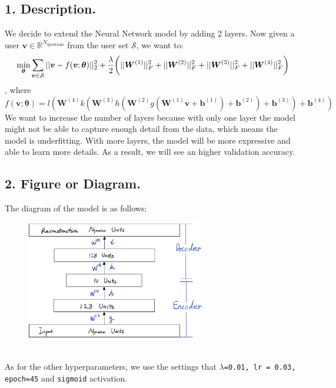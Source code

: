 \documentclass{article}
\newcommand{\coding}[1]{\colorbox{light-gray}{\texttt{#1}}}
\newcommand{\bb}[3]{\bigg{#1} #3 \bigg{#2}}
\begin{document}
\begin{spacing}{1.5}
\subsection*{1. Description.}
We decide to extend the Neural Network model by adding 2 layers. Now given a user $\bm{v}\in \mathbb{R}^{N_{\text{questions}}}$ from the user set $\mathcal{S}$, we want to: 
\[\min_{\bm{\theta}} \sum_{\bm{v} \in \mathcal{S}}||\bm{v} - f(\bm{v}; \bm{\theta})||_2^2 + \frac{\lambda}{2}\bb{(}{)}{||\bm{W}^{(1)}||_F^2 + ||\bm{W}^{(2)}||_F^2 + ||\bm{W}^{(3)}||_F^2 +||\bm{W}^{(4)}||_F^2}\], where 
\[f(\bm{v}; \bm{\theta}) =l(\bm{W}^{(4)}k(\bm{W}^{(3)}h(\bm{W}^{(2)}g(\bm{W}^{(1)}\bm{v}+\bm{b}^{(1)})+\bm{b}^{(2)})+\bm{b}^{(3)})+\bm{b}^{(4)}) \]
We want to increase the number of layers because with only one layer the model might not be able to capture enough detail from the data, which means the model is underfitting. With more layers, the model will be more 
expressive and able to learn more details. As a result, we will see an higher validation accuracy. 
\subsection*{2. Figure or Diagram.}
The diagram of the model is as follows: 
\begin{figure}[htbp]
	\centering
	\includegraphics[width=0.7\textwidth]{nnModel.png}
\end{figure}\\
As for the other hyperparameters, we use the settings that \coding{$\lambda$=0.01, lr = 0.03, epoch=45} and \coding{sigmoid} activation.

\end{spacing}
\end{document}
